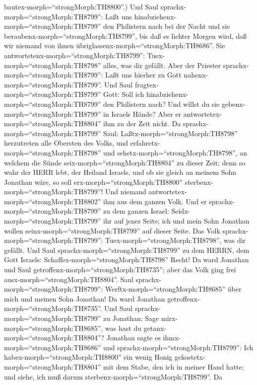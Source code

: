 bautex-morph=``strongMorph:TH8800''.)  Und Saul
sprachx-morph=``strongMorph:TH8799'': Laßt uns
hinabziehenx-morph=``strongMorph:TH8799'' den Philistern nach bei der
Nacht und sie beraubenx-morph=``strongMorph:TH8799'', bis daß es lichter
Morgen wird, daß wir niemand von ihnen
übriglassenx-morph=``strongMorph:TH8686''. Sie
antwortetenx-morph=``strongMorph:TH8799'':
Tuex-morph=``strongMorph:TH8798'' alles, was dir gefällt. Aber der
Priester sprachx-morph=``strongMorph:TH8799'': Laßt uns hierher zu Gott
nahenx-morph=``strongMorph:TH8799''.  Und Saul
fragtex-morph=``strongMorph:TH8799'' Gott: Soll ich
hinabziehenx-morph=``strongMorph:TH8799'' den Philistern nach? Und
willst du sie gebenx-morph=``strongMorph:TH8799'' in Israels Hände? Aber
er antwortetex-morph=``strongMorph:TH8804'' ihm zu der Zeit nicht.
 Da sprachx-morph=``strongMorph:TH8799'' Saul:
Laßtx-morph=``strongMorph:TH8798'' herzutreten alle Obersten des Volks,
und erfahretx-morph=``strongMorph:TH8798'' und
sehetx-morph=``strongMorph:TH8798'', an welchem die Sünde
seix-morph=``strongMorph:TH8804'' zu dieser Zeit;  denn so
wahr der HERR lebt, der Heiland Israels, und ob sie gleich an meinem
Sohn Jonathan wäre, so soll erx-morph=``strongMorph:TH8800''
sterbenx-morph=``strongMorph:TH8799''! Und niemand
antwortetex-morph=``strongMorph:TH8802'' ihm aus dem ganzen Volk.
 Und er sprachx-morph=``strongMorph:TH8799'' zu dem ganzen
Israel: Seidx-morph=``strongMorph:TH8799'' ihr auf jener Seite; ich und
mein Sohn Jonathan wollen seinx-morph=``strongMorph:TH8799'' auf dieser
Seite. Das Volk sprachx-morph=``strongMorph:TH8799'':
Tuex-morph=``strongMorph:TH8798'', was dir gefällt.  Und
Saul sprachx-morph=``strongMorph:TH8799'' zu dem HERRN, dem Gott
Israels: Schaffex-morph=``strongMorph:TH8798'' Recht! Da ward Jonathan
und Saul getroffenx-morph=``strongMorph:TH8735''; aber das Volk ging
frei ausx-morph=``strongMorph:TH8804''.  Saul
sprachx-morph=``strongMorph:TH8799'':
Werftx-morph=``strongMorph:TH8685'' über mich und meinen Sohn Jonathan!
Da ward Jonathan getroffenx-morph=``strongMorph:TH8735''. 
Und Saul sprachx-morph=``strongMorph:TH8799'' zu Jonathan: Sage
mirx-morph=``strongMorph:TH8685'', was hast du
getanx-morph=``strongMorph:TH8804''? Jonathan sagte es
ihmx-morph=``strongMorph:TH8686'' und
sprachx-morph=``strongMorph:TH8799'': Ich
habex-morph=``strongMorph:TH8800'' ein wenig Honig
gekostetx-morph=``strongMorph:TH8804'' mit dem Stabe, den ich in meiner
Hand hatte; und siehe, ich muß darum
sterbenx-morph=``strongMorph:TH8799''.  Da
